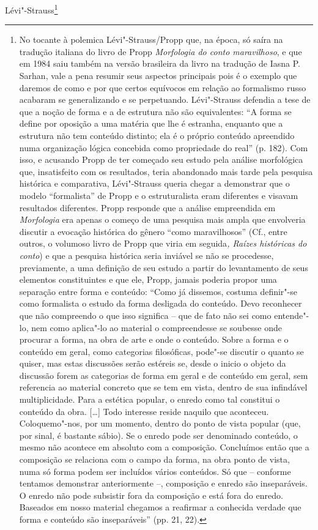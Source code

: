 Lévi"-Strauss\footnote{No tocante à polemica Lévi"-Strauss/Propp que, na
  época, só saíra na tradução italiana do livro de Propp
  \emph{Morfologia do conto maravilhoso}, e que em 1984 saiu também na
  versão brasileira da livro na tradução de Iasna P. Sarhan, vale a pena
  resumir seus aspectos principais pois é o exemplo que daremos de como
  e por que certos equívocos em relação ao formalismo russo acabaram se
  generalizando e se perpetuando. Lévi"-Strauss defendia a tese de que a
  noção de forma e a de estrutura não são equivalentes: ``A forma se
  define por oposição a uma matéria que lhe é estranha, enquanto que a
  estrutura não tem conteúdo distinto; ela é o próprio conteúdo
  apreendido numa organização lógica concebida como propriedade do
  real'' (p. 182). Com isso, e acusando Propp de ter começado seu estudo
  pela análise morfológica que, insatisfeito com os resultados, teria
  abandonado mais tarde pela pesquisa histórica e comparativa,
  Lévi"-Strauss queria chegar a demonstrar que o modelo ``formalista'' de
  Propp e o estruturalista eram diferentes e visavam resultados
  diferentes. Propp responde que a análise empreendida em
  \emph{Morfologia} era apenas o começo de uma pesquisa mais ampla que
  envolveria discutir a evocação histórica do gênero ``como
  maravilhosos'' (Cf., entre outros, o volumoso livro de Propp que viria
  em seguida\emph{, Raízes históricas do conto}) e que a pesquisa
  histórica seria inviável se não se procedesse, previamente, a uma
  definição de seu estudo a partir do levantamento de seus elementos
  constituintes e que ele, Propp, jamais poderia propor uma separação
  entre forma e conteúdo: ``Como já dissemos, costuma definir"-se como
  formalista o estudo da forma desligada do conteúdo. Devo reconhecer
  que não compreendo o que isso significa -- que de fato não sei como
  entende"-lo, nem como aplica"-lo ao material o compreendesse se soubesse
  onde procurar a forma, na obra de arte e onde o conteúdo. Sobre a
  forma e o conteúdo em geral, como categorias filosóficas, pode"-se
  discutir o quanto se quiser, mas estas discussões serão estéreis se,
  desde o inicio o objeto da discussão forem as categorias de forma em
  geral e de conteúdo em geral, sem referencia ao material concreto que
  se tem em vista, dentro de sua infindável multiplicidade. Para a
  estética popular, o enredo como tal constitui o conteúdo da obra.
  {[}\ldots{}{]} Todo interesse reside naquilo que aconteceu. Coloquemo"-nos,
  por um momento, dentro do ponto de vista popular (que, por sinal, é
  bastante sábio). Se o enredo pode ser denominado conteúdo, o mesmo não
  acontece em absoluto com a composição. Concluímos então que a
  composição se relaciona com o campo da forma, na obra ponto de vista,
  numa só forma podem ser incluídos vários conteúdos. Só que -- conforme
  tentamos demonstrar anteriormente --, composição e enredo são
  inseparáveis. O enredo não pode subsistir fora da composição e está
  fora do enredo. Baseados em nosso material chegamos a reafirmar a
  conhecida verdade que forma e conteúdo são inseparáveis'' (pp. 21,
  22).

}
